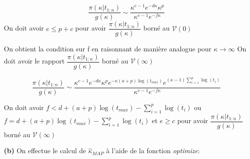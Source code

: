 \documentclass[
]{article}
\newenvironment{Shaded}{\begin{snugshade}}{\end{snugshade}}
\newcommand{\ControlFlowTok}[1]{\textcolor[rgb]{0.13,0.29,0.53}{\textbf{#1}}}
\newcommand{\DataTypeTok}[1]{\textcolor[rgb]{0.13,0.29,0.53}{#1}}
\newcommand{\DecValTok}[1]{\textcolor[rgb]{0.00,0.00,0.81}{#1}}
\newcommand{\FloatTok}[1]{\textcolor[rgb]{0.00,0.00,0.81}{#1}}
\newcommand{\KeywordTok}[1]{\textcolor[rgb]{0.13,0.29,0.53}{\textbf{#1}}}
\newcommand{\NormalTok}[1]{#1}
\newcommand{\OperatorTok}[1]{\textcolor[rgb]{0.81,0.36,0.00}{\textbf{#1}}}
\newcommand{\OtherTok}[1]{\textcolor[rgb]{0.56,0.35,0.01}{#1}}
\newcommand{\StringTok}[1]{\textcolor[rgb]{0.31,0.60,0.02}{#1}}
\begin{document}
\[\dfrac{\pi(\kappa| t_{1:n})}{g(\kappa)} \sim \dfrac{\kappa^{c-1}e^{-d\kappa}\kappa^{p}}{\kappa^{e-1}e^{-f\kappa}} \]
On doit avoir \(e \le p+c\) pour avoir
\(\dfrac{\pi(\kappa| t_{1:n})}{g(\kappa)}\) borné au \(\mathcal{V}(0)\)

On obtient la condition sur f en raisonnant de manière analogue pour
\(\kappa \to \infty\) On doit avoir le rapport
\(\dfrac{\pi(\kappa| t_{1:n})}{g(\kappa)}\) borné au
\(\mathcal{V}(\infty)\)

\[\dfrac{\pi(\kappa| t_{1:n})}{g(\kappa)} \sim \dfrac{\kappa^{c-1}e^{-d\kappa}\kappa^{p}e^{-\kappa (a+p) \log (t_{max})}e^{(\kappa-1)\sum_{i=1}^{p}\log(t_{i})}}{\kappa^{e-1}e^{-f\kappa}} \]

On doit avoir \(f < d + (a+p)\log(t_{max}) - \sum_{i=1}^{p}\log(t_{i})\)
ou \(f = d + (a+p)\log(t_{max}) - \sum_{i=1}^{p}\log(t_{i})\) et
\(e\geq c\) pour avoir \(\dfrac{\pi(\kappa| t_{1:n})}{g(\kappa)}\) borné
au \(\mathcal{V}(\infty)\)

\textbf{(b)} On effectue le calcul de \(\hat{\kappa}_{MAP}\) à l'aide de
la fonction \emph{optimize}:

\begin{Shaded}
\end{Shaded}
\end{document}
